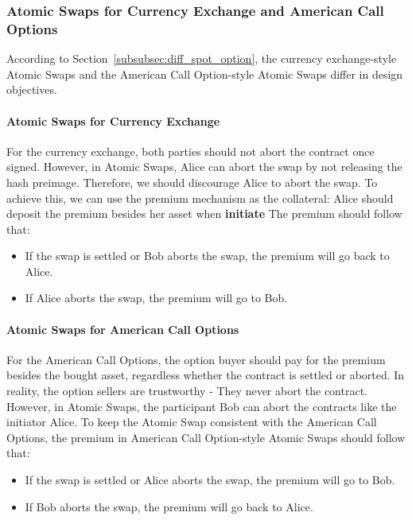 \subsubsection{Atomic Swaps for Currency Exchange and American Call Options}
\label{subsubsec:design_obj}

According to Section~\ref{subsubsec:diff_spot_option}, the currency exchange-style Atomic Swaps and the American Call Option-style Atomic Swaps differ in design objectives.

\paragraph{Atomic Swaps for Currency Exchange}
For the currency exchange, both parties should not abort the contract once signed.
However, in Atomic Swaps, Alice can abort the swap by not releasing the hash preimage.
Therefore, we should discourage Alice to abort the swap.
To achieve this, we can use the premium mechanism as the collateral: Alice should deposit the premium besides her asset when \textbf{initiate}
The premium should follow that:

\begin{itemize}
    \item If the swap is settled or Bob aborts the swap, the premium will go back to Alice.
    \item If Alice aborts the swap, the premium will go to Bob.
\end{itemize}

\paragraph{Atomic Swaps for American Call Options}
For the American Call Options, the option buyer should pay for the premium besides the bought asset, regardless whether the contract is settled or aborted.
In reality, the option sellers are trustworthy - They never abort the contract.
However, in Atomic Swaps, the participant Bob can abort the contracts like the initiator Alice.
To keep the Atomic Swap consistent with the American Call Options,
the premium in American Call Option-style Atomic Swaps should follow that: 

\begin{itemize}
    \item If the swap is settled or Alice aborts the swap, the premium will go to Bob.
    \item If Bob aborts the swap, the premium will go back to Alice.
\end{itemize}












